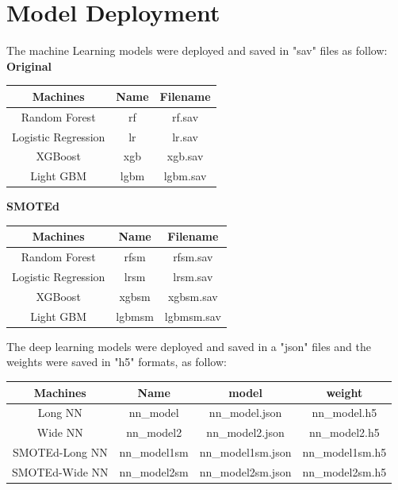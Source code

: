 \documentclass{homeworg}
\begin{document}
\section{Model Deployment}
The machine Learning models were deployed and saved in "sav" files as follow:\\
\textbf{Original}
\begin{center}
\begin{tabular}{ |c|c|c| } 
 \hline
 \hline
 \textbf{Machines} & \textbf{Name} & \textbf{Filename} \\ 
 \hline
 \hline
 Random Forest & rf & rf.sav \\ 
 \hline
 Logistic Regression & lr & lr.sav \\ 
 \hline
 XGBoost & xgb & xgb.sav \\ 
 \hline
 Light GBM & lgbm & lgbm.sav \\ 
 \hline
 \hline
\end{tabular}
\end{center}
\textbf{SMOTEd}
\begin{center}
\begin{tabular}{ |c|c|c| } 
 \hline
 \hline
 \textbf{Machines} & \textbf{Name} & \textbf{Filename} \\ 
 \hline
 \hline
 Random Forest & rfsm & rfsm.sav \\ 
 \hline
 Logistic Regression & lrsm & lrsm.sav \\ 
 \hline
 XGBoost & xgbsm & xgbsm.sav \\ 
 \hline
 Light GBM & lgbmsm & lgbmsm.sav \\ 
 \hline
 \hline
\end{tabular}
\end{center}

The deep learning models were deployed and saved in a "json" files and the weights were saved in "h5" formats, as follow:

\begin{center}
\begin{tabular}{ |c|c|c|c| } 
 \hline
 \hline
 \textbf{Machines} & \textbf{Name} & \textbf{model} & \textbf{weight}\\ 
 \hline
 \hline
 Long NN & nn\_model & nn\_model.json & nn\_model.h5 \\ 
 \hline
 Wide NN & nn\_model2 & nn\_model2.json & nn\_model2.h5 \\ 
 \hline
 SMOTEd-Long NN & nn\_model1sm & nn\_model1sm.json & nn\_model1sm.h5 \\ 
 \hline
 SMOTEd-Wide NN & nn\_model2sm & nn\_model2sm.json & nn\_model2sm.h5 \\ 
 \hline
 \hline
\end{tabular}
\end{center}
\end{document}
